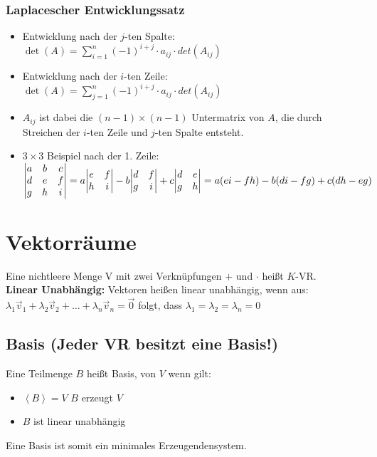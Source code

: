 \documentclass[6pt,a4paper]{scrartcl}
\begin{document}
\begin{multicols}{3}
\subsubsection{Laplacescher Entwicklungssatz}
\begin{itemize}
	\item Entwicklung nach der $j$-ten Spalte:
	\subitem $\det(A)=\sum\limits_{i=1}^n (-1)^{i+j} \cdot a_{ij} \cdot det(A_{ij})$
	\item Entwicklung nach der $i$-ten Zeile:
	\subitem $\det(A)=\sum\limits_{j=1}^n (-1)^{i+j} \cdot a_{ij} \cdot det(A_{ij})$
	\item $A_{ij}$ ist dabei die $(n-1)\times(n-1)$ Untermatrix von $A$, die durch Streichen der $i$-ten Zeile und $j$-ten Spalte entsteht.
	\item $3\times 3$ Beispiel nach der 1. Zeile: ${\begin{vmatrix}a&b&c\\d&e&f\\g&h&i\end{vmatrix}}\\=a{\begin{vmatrix}e&f\\h&i\end{vmatrix}}-b{\begin{vmatrix}d&f\\g&i\end{vmatrix}}+c{\begin{vmatrix}d&e\\g&h\end{vmatrix}}=a(ei-fh)-b(di-fg)+c(dh-eg)$
\end{itemize}

\section{Vektorräume}
Eine nichtleere Menge V mit zwei Verknüpfungen $+$ und $\cdot$ heißt $K$-VR.\\
\textbf{Linear Unabhängig:}
Vektoren heißen linear unabhängig, wenn aus: \\
$\lambda_1 \vec v_1 + \lambda_2 \vec v_2 + \ldots + \lambda_n \vec v_n = \vec 0$ folgt, dass $\lambda_1 = \lambda_2 = \lambda_n = 0$

\subsection{Basis (Jeder VR besitzt eine Basis!)}
\label{sub:basis}
Eine Teilmenge $B$ heißt Basis, von $V$ wenn gilt:
\begin{itemize}\itemsep0pt
	\item $\left\langle B \right\rangle =V$  $B$ erzeugt $V$
	\item $B$ ist linear unabhängig
\end{itemize}
Eine Basis ist somit ein minimales Erzeugendensystem.          


\end{multicols}
\end{document}
